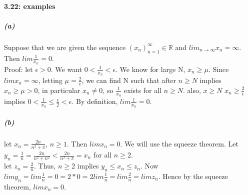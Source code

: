 \documentclass[10pt,letter]{article}
\begin{document}
\paragraph{3.22: examples}
\subparagraph{(a)}
Suppose that we are given the sequence $(x_n)_{n=1}^\infty \in \mathbb{R}$ and $lim_{n\rightarrow\infty} x_n = \infty$. Then $lim\frac{1}{x_n} = 0$. \\ 
Proof: let $\epsilon > 0$. We want $0 < \frac{1}{x_n} < \epsilon$. We know for large N, $x_n \geq \mu$. 
Since $lim x_n = \infty$, letting $\mu = \frac{2}{\epsilon}$, we can find N such that after $n \geq N$ implies $x_n \geq \mu > 0$, in particular $x_n \neq 0$, so $\frac{1}{x_n}$ exists for all $n \geq N$. also, $x \geq N$ $x_n \geq \frac{2}{\epsilon}$ implies $0 < \frac{1}{x_n} \leq \frac{\epsilon}{2} < \epsilon$. By definition, $lim \frac{1}{x_n} = 0$.

\subparagraph{(b)}
let $x_n = \frac{2n}{n^2 + \pi}$, $n \geq 1$. Then $lim x_n = 0$. We will use the squeeze theorem. Let $y_n = \frac{1}{n} = \frac{2n}{n^2 + n^2} < \frac{2n}{n^2 + \pi} = x_n$ for all $n \geq 2$.\\ 
let $z_n = \frac{2}{n}$. Thus, $n \geq 2$ implies $y_n \leq x_n \leq z_n$. Now $lim y_n = lim \frac{1}{n} = 0 = 2 * 0 = 2lim \frac{1}{n} = lim \frac{2}{n} = lim z_n$. Hence by the squeeze theorem, $lim x_n = 0$. 
\end{document}
